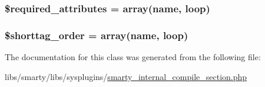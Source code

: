 \subsubsection[{\$required\+\_\+attributes}]{\setlength{\rightskip}{0pt plus 5cm}\$required\+\_\+attributes = array(\textquotesingle{}name\textquotesingle{}, \textquotesingle{}loop\textquotesingle{})}\label{class_smarty___internal___compile___section_ae799507d5461de485f3a618abeecea95}
\hypertarget{class_smarty___internal___compile___section_a2ccb25269c3a92e8c4796c7ef23725e6}{}
\subsubsection[{\$shorttag\+\_\+order}]{\setlength{\rightskip}{0pt plus 5cm}\$shorttag\+\_\+order = array(\textquotesingle{}name\textquotesingle{}, \textquotesingle{}loop\textquotesingle{})}\label{class_smarty___internal___compile___section_a2ccb25269c3a92e8c4796c7ef23725e6}


The documentation for this class was generated from the following file\+:\begin{DoxyCompactItemize}
\item 
libs/smarty/libs/sysplugins/\hyperlink{smarty__internal__compile__section_8php}{smarty\+\_\+internal\+\_\+compile\+\_\+section.\+php}\end{DoxyCompactItemize}
